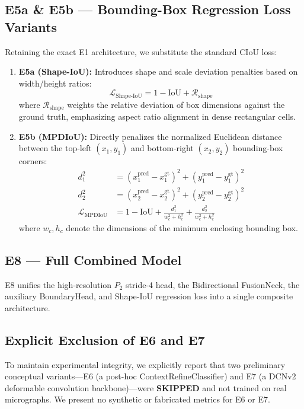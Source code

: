 \documentclass[conference]{IEEEtran}
\begin{document}
\subsection{E5a \& E5b --- Bounding-Box Regression Loss Variants}
Retaining the exact E1 architecture, we substitute the standard CIoU loss:
\begin{enumerate}
    \item \textbf{E5a (Shape-IoU):} Introduces shape and scale deviation penalties based on width/height ratios:
    \begin{equation}
    \mathcal{L}_{\text{Shape-IoU}} = 1 - \text{IoU} + \mathcal{R}_{\text{shape}}
    \end{equation}
    where $\mathcal{R}_{\text{shape}}$ weights the relative deviation of box dimensions against the ground truth, emphasizing aspect ratio alignment in dense rectangular cells.
    \item \textbf{E5b (MPDIoU):} Directly penalizes the normalized Euclidean distance between the top-left $(x_1, y_1)$ and bottom-right $(x_2, y_2)$ bounding-box corners:
    \begin{align}
    d_1^2 &= (x_1^{\text{pred}} - x_1^{\text{gt}})^2 + (y_1^{\text{pred}} - y_1^{\text{gt}})^2 \\
    d_2^2 &= (x_2^{\text{pred}} - x_2^{\text{gt}})^2 + (y_2^{\text{pred}} - y_2^{\text{gt}})^2 \\
    \mathcal{L}_{\text{MPDIoU}} &= 1 - \text{IoU} + \frac{d_1^2}{w_c^2 + h_c^2} + \frac{d_2^2}{w_c^2 + h_c^2}
    \end{align}
    where $w_c, h_c$ denote the dimensions of the minimum enclosing bounding box.
\end{enumerate}

\subsection{E8 --- Full Combined Model}
E8 unifies the high-resolution $P_2$ stride-4 head, the Bidirectional FusionNeck, the auxiliary BoundaryHead, and Shape-IoU regression loss into a single composite architecture.

\subsection{Explicit Exclusion of E6 and E7}
To maintain experimental integrity, we explicitly report that two preliminary conceptual variants---E6 (a post-hoc ContextRefineClassifier) and E7 (a DCNv2 deformable convolution backbone)---were \textbf{SKIPPED} and not trained on real micrographs. We present no synthetic or fabricated metrics for E6 or E7.
\end{document}
